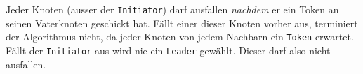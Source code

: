 Jeder Knoten (ausser der \verb+Initiator+) darf ausfallen \emph{nachdem} er ein Token
an seinen Vaterknoten geschickt hat. Fällt einer dieser Knoten vorher aus,
terminiert der Algorithmus nicht, da jeder Knoten von jedem Nachbarn ein
\verb+Token+ erwartet. Fällt der \verb+Initiator+ aus wird nie ein \verb+Leader+
gewählt. Dieser darf also nicht ausfallen.

